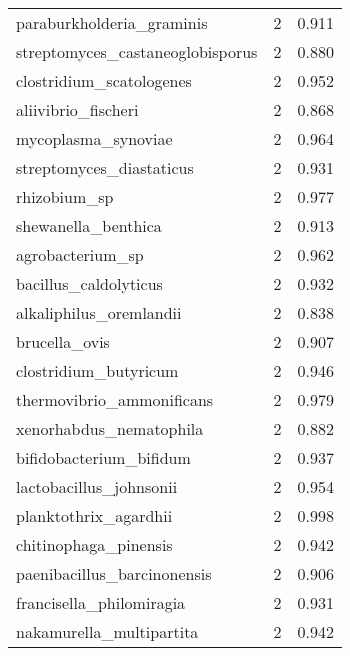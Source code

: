 \begin{tabular}{lrr}
                   paraburkholderia\_graminis &                   2 &     0.911 \\
            streptomyces\_castaneoglobisporus &                   2 &     0.880 \\
                    clostridium\_scatologenes &                   2 &     0.952 \\
                         aliivibrio\_fischeri &                   2 &     0.868 \\
                         mycoplasma\_synoviae &                   2 &     0.964 \\
                    streptomyces\_diastaticus &                   2 &     0.931 \\
                                rhizobium\_sp &                   2 &     0.977 \\
                         shewanella\_benthica &                   2 &     0.913 \\
                            agrobacterium\_sp &                   2 &     0.962 \\
                       bacillus\_caldolyticus &                   2 &     0.932 \\
                     alkaliphilus\_oremlandii &                   2 &     0.838 \\
                               brucella\_ovis &                   2 &     0.907 \\
                       clostridium\_butyricum &                   2 &     0.946 \\
                   thermovibrio\_ammonificans &                   2 &     0.979 \\
                     xenorhabdus\_nematophila &                   2 &     0.882 \\
                     bifidobacterium\_bifidum &                   2 &     0.937 \\
                     lactobacillus\_johnsonii &                   2 &     0.954 \\
                       planktothrix\_agardhii &                   2 &     0.998 \\
                       chitinophaga\_pinensis &                   2 &     0.942 \\
                 paenibacillus\_barcinonensis &                   2 &     0.906 \\
                    francisella\_philomiragia &                   2 &     0.931 \\
                    nakamurella\_multipartita &                   2 &     0.942 \\

\end{tabular}
